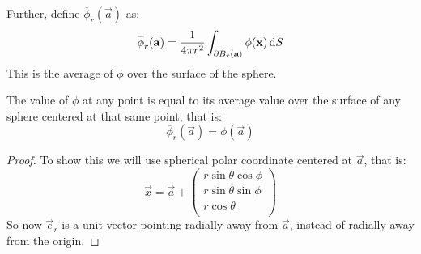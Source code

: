 \documentclass[../main.tex]{subfiles}
\begin{document}
Further, define $\overline{\phi}_r(\vec{a})$ as:
\[
  \overline{\phi}_r(\vec{a}) = \frac{1}{4\pi r^2} \int_{\partial B_r(\vec{a})} \phi(\vec{x}) \d{S}
\]
This is the average of $\phi$ over the surface of the sphere.
\begin{lemma}
  The value of $\phi$ at any point is equal to its average value over the surface of any sphere centered at that same point, that is: \label{sphereAverage}
  \[
    \overline{\phi}_r(\vec{a}) = \phi(\vec{a})
  \]
\end{lemma}
\begin{proof}
  To show this we will use spherical polar coordinate centered at $\vec{a}$, that is:
  \[
    \vec{x} = \vec{a} + \begin{pmatrix}
    r\sin \theta \cos \phi \\
    r \sin \theta \sin \phi \\
    r \cos \theta \\
    \end{pmatrix}
  \]
  So now $\vec{e}_r$ is a unit vector pointing radially away from $\vec{a}$, instead of radially away from the origin.


\end{proof}
\end{document}

